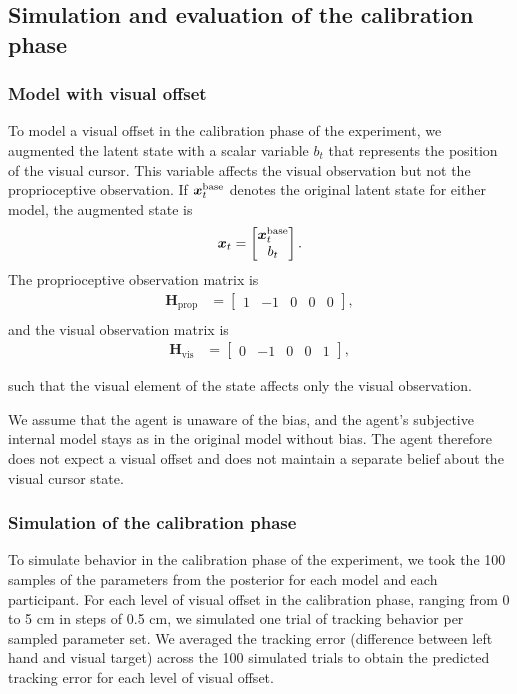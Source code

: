 \documentclass{article}
\begin{document}
\subsection{Simulation and evaluation of the calibration phase}

\subsubsection{Model with visual offset}
To model a visual offset in the calibration phase of the experiment, we augmented the latent state with a scalar variable $b_t$ that represents the position of the visual cursor. This variable affects the visual observation but not the proprioceptive observation. If ${\bm x}_t^\text{base}$ denotes the original latent state for either model, the augmented state is
\begin{align}
    {\bm x}_t = \begin{bmatrix}
        {\bm x}_t^\text{base} \\ b_t
    \end{bmatrix}.
\end{align}
The proprioceptive observation matrix is
    \begin{align}
        \mathbf H_\text{prop} &= \begin{bmatrix} 1 & -1 & 0 & 0 & 0 \end{bmatrix}, \\
    \end{align}
    and the visual observation matrix is
    \begin{align}
        \mathbf H_\text{vis} &= \begin{bmatrix} 0 & -1 & 0 & 0 & 1 \end{bmatrix},
    \end{align}
    
such that the visual element of the state affects only the visual observation.

We assume that the agent is unaware of the bias, and the agent's subjective internal model stays as in the original model without bias. The agent therefore does not expect a visual offset and does not maintain a separate belief about the visual cursor state.

\subsubsection{Simulation of the calibration phase}
To simulate behavior in the calibration phase of the experiment, we took the 100 samples of the parameters from the posterior for each model and each participant. For each level of visual offset in the calibration phase, ranging from 0 to 5 cm in steps of 0.5 cm, we simulated one trial of tracking behavior per sampled parameter set. We averaged the tracking error (difference between left hand and visual target) across the 100 simulated trials to obtain the predicted tracking error for each level of visual offset.
\end{document}
